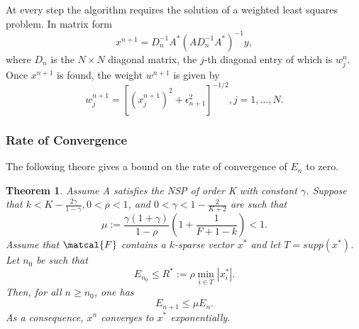 \documentclass[
  english,        %
  font=times,     %
  onecolumn,      %
]{tumarticle}
\newtheorem{theorem}{Theorem}[section]
\numberwithin{equation}{section} %
\begin{document}
\begin{large}
\begin{adjustwidth}{0pt}{0pt}
At every step the algorithm requires the solution of a weighted least squares problem. In matrix form
\[ x^{n+1} = D_n^{-1} A^* (A D_n^{-1} A^*)^{-1} y,\]
where $D_n$ is the $N \times N$ diagonal matrix, the $j$-th diagonal entry of which is $w_j^n$. Once $x^{n+1}$ is found, the weight $w^{n+1}$ is given by
\[ w_j^{n+1} = [(x_j^{n+1})^2 + \epsilon_{n+1}^2]^{-1/2}, j = 1,...,N.\]

\subsubsection{Rate of Convergence}
The following theore gives a bound on the rate of convergence of $E_n$ to zero.

\begin{theorem}
Assume A satisfies the NSP of order K with constant $\gamma$. Suppose that $k < K - \frac{2\gamma}{1-\gamma}, 0 < \rho < 1$, and $0 < \gamma < 1 - \frac{2}{K+2}$ are such that
\[\mu := \frac{\gamma (1 + \gamma)}{1 - \rho} (1 + \frac{1}{F + 1 - k}) < 1.\]
Assume that $\matcal{F}$ contains a $k$-sparse vector $x^*$ and let $T = supp(x^*)$. Let $n_0$ be such that
\[E_n_0 \leq R^* := \rho \min_{i \in T} |x_i^*|.\]
Then, for all $n \geq n_0$, one has
\begin{equation}
\label{irls:cr} E_{n+1} \leq \mu E_n.
\end{equation}
As a consequence, $x^n$ converges to $x^*$ exponentially.
\end{theorem}


\end{adjustwidth}
\end{large}
\end{document}
